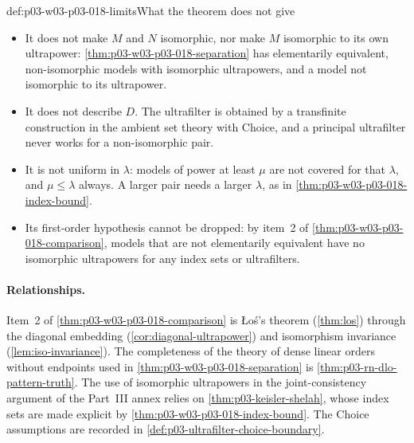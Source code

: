 \begin{hbwarning}{def:p03-w03-p03-018-limits}{What the theorem does not give}
\begin{itemize}
  \item It does not make \(M\) and \(N\) isomorphic, nor make \(M\)
        isomorphic to its own ultrapower:
        \cref{thm:p03-w03-p03-018-separation} has elementarily equivalent,
        non-isomorphic models with isomorphic ultrapowers, and a model not
        isomorphic to its ultrapower.
  \item It does not describe \(D\).  The ultrafilter is obtained by a
        transfinite construction in the ambient set theory with Choice, and
        a principal ultrafilter never works for a non-isomorphic pair.
  \item It is not uniform in \(\lambda\): models of power at least \(\mu\)
        are not covered for that \(\lambda\), and \(\mu\le\lambda\) always.
        A larger pair needs a larger \(\lambda\), as in
        \cref{thm:p03-w03-p03-018-index-bound}.
  \item Its first-order hypothesis cannot be dropped: by item~2 of
        \cref{thm:p03-w03-p03-018-comparison}, models that are not
        elementarily equivalent have no isomorphic ultrapowers for any index
        sets or ultrafilters.
\end{itemize}
\end{hbwarning}

\paragraph{Relationships.}
Item~2 of \cref{thm:p03-w03-p03-018-comparison} is \L o\'s's theorem
(\cref{thm:los}) through the diagonal embedding
(\cref{cor:diagonal-ultrapower}) and isomorphism invariance
(\cref{lem:iso-invariance}).  The completeness of the theory of dense linear
orders without endpoints used in \cref{thm:p03-w03-p03-018-separation} is
\cref{thm:p03-rn-dlo-pattern-truth}.  The use of isomorphic ultrapowers in
the joint-consistency argument of the Part~III annex relies on
\cref{thm:p03-keisler-shelah}, whose index sets are made explicit by
\cref{thm:p03-w03-p03-018-index-bound}.  The Choice assumptions are recorded
in \cref{def:p03-ultrafilter-choice-boundary}.

